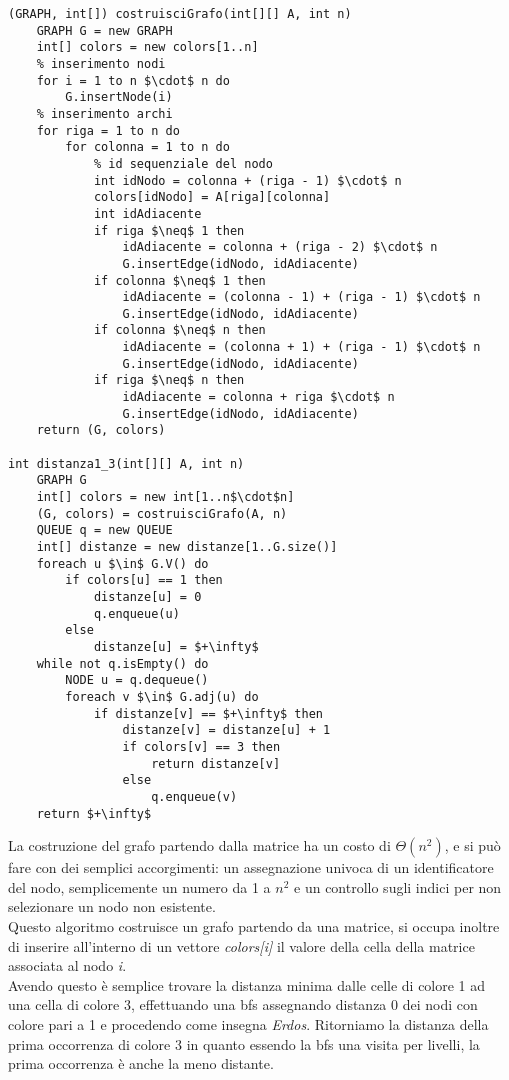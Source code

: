 \documentclass[../cheatSheetAlgoritmi.tex]{subfiles}
\begin{document}
\begin{lstlisting}[caption=Griglia quadra - costruzione grafo]
(GRAPH, int[]) costruisciGrafo(int[][] A, int n)
	GRAPH G = new GRAPH
  	int[] colors = new colors[1..n]
  	% inserimento nodi
  	for i = 1 to n $\cdot$ n do
    	G.insertNode(i)
  	% inserimento archi
  	for riga = 1 to n do
    	for colonna = 1 to n do
      		% id sequenziale del nodo
      		int idNodo = colonna + (riga - 1) $\cdot$ n
      		colors[idNodo] = A[riga][colonna]
      		int idAdiacente
      		if riga $\neq$ 1 then 
        		idAdiacente = colonna + (riga - 2) $\cdot$ n
        		G.insertEdge(idNodo, idAdiacente)
      		if colonna $\neq$ 1 then
        		idAdiacente = (colonna - 1) + (riga - 1) $\cdot$ n
        		G.insertEdge(idNodo, idAdiacente)
      		if colonna $\neq$ n then
        		idAdiacente = (colonna + 1) + (riga - 1) $\cdot$ n
        		G.insertEdge(idNodo, idAdiacente)
      		if riga $\neq$ n then
        		idAdiacente = colonna + riga $\cdot$ n
        		G.insertEdge(idNodo, idAdiacente)
  	return (G, colors)

int distanza1_3(int[][] A, int n)
	GRAPH G
  	int[] colors = new int[1..n$\cdot$n]
  	(G, colors) = costruisciGrafo(A, n)
  	QUEUE q = new QUEUE
  	int[] distanze = new distanze[1..G.size()]
  	foreach u $\in$ G.V() do
    	if colors[u] == 1 then
      		distanze[u] = 0
      		q.enqueue(u)
    	else
      		distanze[u] = $+\infty$
  	while not q.isEmpty() do
    	NODE u = q.dequeue()
    	foreach v $\in$ G.adj(u) do
      		if distanze[v] == $+\infty$ then
        		distanze[v] = distanze[u] + 1
        		if colors[v] == 3 then 
          			return distanze[v]
        		else
          			q.enqueue(v)
  	return $+\infty$
\end{lstlisting}
La costruzione del grafo partendo dalla matrice ha un costo di $\Theta(n^2)$, e si può fare con dei semplici accorgimenti: un assegnazione univoca di un identificatore del nodo, semplicemente un numero da 1 a $n^2$ e un controllo sugli indici per non selezionare un nodo non esistente. \\
Questo algoritmo costruisce un grafo partendo da una matrice, si occupa inoltre di inserire all'interno di un vettore \textit{colors[i]} il valore della cella della matrice associata al nodo \textit{i}. \\ Avendo questo è semplice trovare la distanza minima dalle celle di colore 1 ad una cella di colore 3, effettuando una bfs assegnando distanza 0 dei nodi con colore pari a 1 e procedendo come insegna \textit{Erdos}. Ritorniamo la distanza della prima occorrenza di colore 3 in quanto essendo la bfs una visita per livelli, la prima occorrenza è anche la meno distante.
\end{document}
